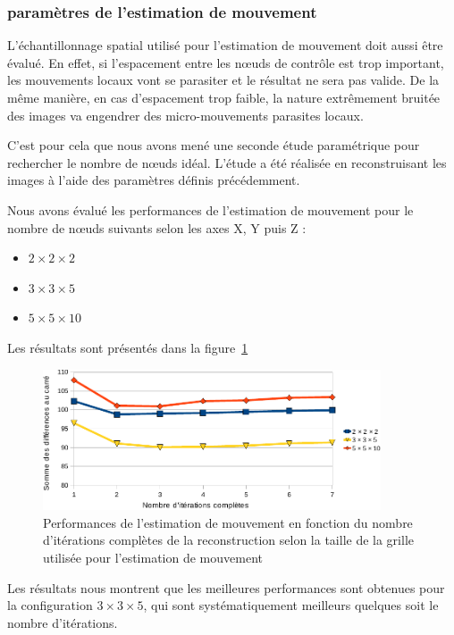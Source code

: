 \subsubsection{paramètres de l'estimation de mouvement}


L'échantillonnage spatial utilisé pour l'estimation de mouvement doit aussi être évalué. En effet, si l'espacement entre les nœuds de contrôle est trop important, les mouvements locaux vont se parasiter et le résultat ne sera pas valide. De la même manière, en cas d'espacement trop faible, la nature extrêmement bruitée des images va engendrer des micro-mouvements parasites locaux.

C'est pour cela que nous avons mené une seconde étude paramétrique pour rechercher le nombre de nœuds idéal. L'étude a été réalisée en reconstruisant les images à l'aide des paramètres définis précédemment.

Nous avons évalué les performances de l'estimation de mouvement pour le nombre de nœuds suivants selon les axes X, Y puis Z :

\begin{itemize}
 \item $2 \times 2 \times 2$
 \item $3 \times 3 \times 5$
 \item $5 \times 5 \times 10$
\end{itemize}

Les résultats sont présentés dans la figure~\ref{fig:perfsFctIterTaille}

\begin{figure}
\centering
\includegraphics[width=10cm]{images/perfsRecalageFctIter-grid_crop}
\caption[Performances de l'estimation de mouvement en fonction de la taille de la grille de recherche]{Performances de l'estimation de mouvement en fonction du nombre d'itérations complètes de la reconstruction selon la taille de la grille utilisée pour l'estimation de mouvement}
\label{fig:perfsFctIterTaille}
\end{figure}

Les résultats nous montrent que les meilleures performances sont obtenues pour la configuration $3 \times 3 \times 5$, qui sont systématiquement meilleurs quelques soit le nombre d’itérations.


